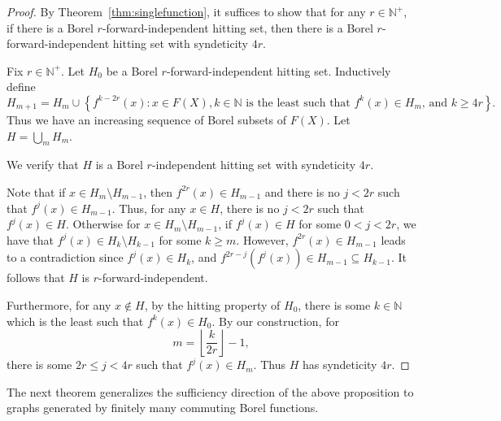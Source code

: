 \documentclass[11pt, reqno, a4paper]{amsart}
\theoremstyle{definition}
\theoremstyle{plain}
\begin{document}
\begin{proof}
 By Theorem~\ref{thm:singlefunction}, it suffices to show that for any $r\in \mathbb N^+$, if there is a Borel $r$-forward-independent hitting set, then there is a Borel $r$-forward-independent hitting set with syndeticity $4r$. 
 
Fix $r\in \mathbb N^+$. Let $H_0$ be a Borel $r$-forward-independent hitting set. Inductively define 
$$H_{m+1}=H_m\cup\left\{f^{k-2r}(x)\colon x\in F(X), \mbox{$k\in\mathbb{N}$ is the least such that $f^k(x)\in H_m$, and $k\geq 4r$}\right\}.$$
 Thus we have an increasing sequence of Borel subsets of $F(X)$. Let $H=\bigcup_m H_m$. 

We verify that $H$ is a Borel $r$-independent hitting set with syndeticity $4r$. 

 Note that if $x\in H_m\setminus H_{m-1}$, then  $f^{2r}(x)\in H_{m-1}$ and there is no $j<2r$ such that $f^j(x)\in H_{m-1}$. Thus, for any $x\in H$, there is no $j<2r$ such that $f^j(x)\in H$. Otherwise for $x\in H_m\setminus H_{m-1}$, if $f^j(x)\in H$ for some $0<j<2r$, we have that $f^j(x)\in H_k\setminus H_{k-1}$ for some $k\ge m$. However, $f^{2r}(x)\in H_{m-1}$ leads to a contradiction since $f^j(x)\in H_k$, and $f^{2r-j}(f^j(x))\in H_{m-1}\subseteq H_{k-1}$.
It follows that $H$ is $r$-forward-independent.

Furthermore, for any $x\notin H$, by the hitting property of $H_0$, there is some $k\in\mathbb{N}$ which is the least such that $f^k(x)\in H_0$. By our construction, for
$$m=\left\lfloor \frac{k}{2r}\right\rfloor-1,$$ 
there is some $2r\leq j<4r$ such that $f^j(x)\in H_m$. Thus $H$ has syndeticity $4r$.
\end{proof}


The next theorem generalizes the sufficiency direction of the above proposition to graphs generated by finitely many commuting Borel functions.
\end{document}
